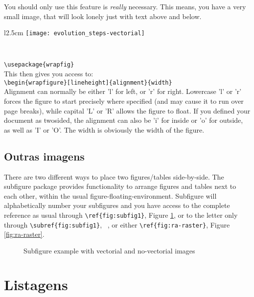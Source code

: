  You should only use this feature is \emph{really} necessary. This means, you have a very small image, that will look lonely just with text above and below.

 \begin{wrapfigure}{l}{2.5cm}
   \centering
     \texttt{[image: evolution\_steps-vectorial]}
   \caption{Vectorial image}\
 \end{wrapfigure}	
 
 \noindent\verb!\usepackage{wrapfig}!\\
 This then gives you access to:\\
 \verb!\begin{wrapfigure}[lineheight]{alignment}{width}!
 \\
 Alignment can normally be either 'l' for left, or 'r' for right. Lowercase 'l' or 'r' forces the figure to start precisely where specified (and may cause it to run over page breaks), while capital 'L' or 'R' allows the figure to float. If you defined your document as twosided, the alignment can also be 'i' for inside or 'o' for outside, as well as 'I' or 'O'. The width is obviously the width of the figure. 
 
\subsection{Outras imagens} %
\label{ssec:floats_figures_and_captions}

 
There are two different ways to place two figures/tables side-by-side. The subfigure package provides functionality to arrange figures and tables next to each other, within the usual figure-floating-environment. Subfigure will alphabetically number your subfigures and you have access to the complete reference as usual through \verb!\ref{fig:subfig1}!, Figure \ref{fig:figura-completa}, or to the letter only through \verb!\subref{fig:subfig1}!, ~, or either \verb!\ref{fig:ra-raster}!, Figure \ref{fig:ra-raster}.

\begin{figure}[H]
	\centering
\qquad\qquad
  \caption{Subfigure example with vectorial and no-vectorial images}
  \label{fig:figura-completa}
\end{figure}

\section{Listagens} %
\label{sec:listings}

